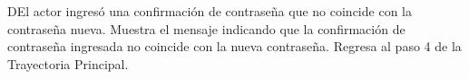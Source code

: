 \begin{UCtrayectoriaA}{D}{El actor ingresó una confirmación de contraseña que no coincide con la contraseña nueva.}
	\UCpaso [\UCactor] Muestra el mensaje   indicando que la confirmación de contraseña ingresada no coincide con la nueva contraseña.
	\UCpaso Regresa al paso 4 de la Trayectoria Principal.
	
\end{UCtrayectoriaA} 

